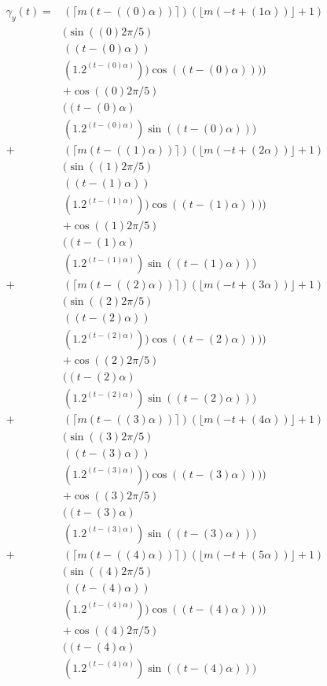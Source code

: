 \documentclass[a4paper,10pt]{article}
\begin{document}
\begin{equation}
\begin{split}
\gamma_y(t) = &(\lceil m(t - ((0)\alpha)) \rceil)(\lfloor m(-t + (1\alpha)) \rfloor + 1) \\
			&( \sin((0)2\pi/5)\\
			&((t-(0)\alpha))\\
			&(1.2^{(t-(0)\alpha)}))\cos((t-(0)\alpha))))\\ 
			&+ \cos((0)2\pi/5)\\
			&((t-(0)\alpha)\\
			&(1.2^{(t-(0)\alpha)})\sin((t-(0)\alpha)))\\
		+	&(\lceil m(t - ((1)\alpha)) \rceil)(\lfloor m(-t + (2\alpha)) \rfloor + 1) \\
			&( \sin((1)2\pi/5)\\
			&((t-(1)\alpha))\\
			&(1.2^{(t-(1)\alpha)}))\cos((t-(1)\alpha))))\\ 
			&+ \cos((1)2\pi/5)\\
			&((t-(1)\alpha)\\
			&(1.2^{(t-(1)\alpha)})\sin((t-(1)\alpha)))\\						
		+	&(\lceil m(t - ((2)\alpha)) \rceil)(\lfloor m(-t + (3\alpha)) \rfloor + 1) \\
			&( \sin((2)2\pi/5)\\
			&((t-(2)\alpha))\\
			&(1.2^{(t-(2)\alpha)}))\cos((t-(2)\alpha))))\\ 
			&+ \cos((2)2\pi/5)\\
			&((t-(2)\alpha)\\
			&(1.2^{(t-(2)\alpha)})\sin((t-(2)\alpha)))\\			
		+	&(\lceil m(t - ((3)\alpha)) \rceil)(\lfloor m(-t + (4\alpha)) \rfloor + 1) \\
			&( \sin((3)2\pi/5)\\
			&((t-(3)\alpha))\\
			&(1.2^{(t-(3)\alpha)}))\cos((t-(3)\alpha))))\\ 
			&+ \cos((3)2\pi/5)\\
			&((t-(3)\alpha)\\
			&(1.2^{(t-(3)\alpha)})\sin((t-(3)\alpha)))\\			
		+	&(\lceil m(t - ((4)\alpha)) \rceil)(\lfloor m(-t + (5\alpha)) \rfloor + 1) \\
			&( \sin((4)2\pi/5)\\
			&((t-(4)\alpha))\\
			&(1.2^{(t-(4)\alpha)}))\cos((t-(4)\alpha))))\\ 
			&+ \cos((4)2\pi/5)\\
			&((t-(4)\alpha)\\
			&(1.2^{(t-(4)\alpha)})\sin((t-(4)\alpha)))\\			
\end{split}
\end{equation}
\end{document}
